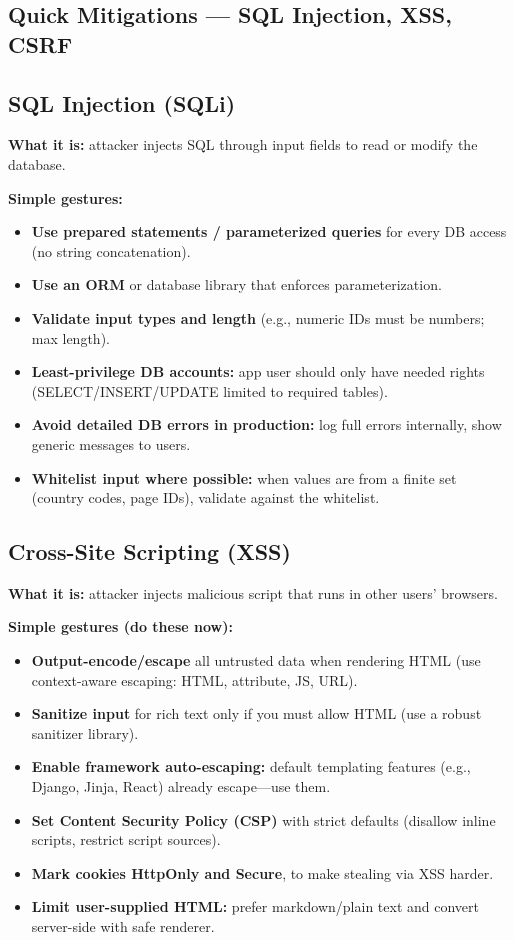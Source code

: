 \documentclass[12pt,a4paper]{report}
\begin{document}
\begin{enumerate}
\subsection*{Quick Mitigations — SQL Injection, XSS, CSRF }



\subsection*{SQL Injection (SQLi)}
\textbf{What it is:} attacker injects SQL through input fields to read or modify the database.

\textbf{Simple gestures:}
\begin{itemize}
  \item \textbf{Use prepared statements / parameterized queries} for every DB access (no string concatenation).  
  \item \textbf{Use an ORM} or database library that enforces parameterization.  
  \item \textbf{Validate input types and length} (e.g., numeric IDs must be numbers; max length).  
  \item \textbf{Least-privilege DB accounts:} app user should only have needed rights (SELECT/INSERT/UPDATE limited to required tables).  
  \item \textbf{Avoid detailed DB errors in production:} log full errors internally, show generic messages to users.  
  \item \textbf{Whitelist input where possible:} when values are from a finite set (country codes, page IDs), validate against the whitelist.  
\end{itemize}
\newpage
\subsection*{Cross-Site Scripting (XSS)}
\textbf{What it is:} attacker injects malicious script that runs in other users’ browsers.

\textbf{Simple gestures (do these now):}
\begin{itemize}
  \item \textbf{Output-encode/escape} all untrusted data when rendering HTML (use context-aware escaping: HTML, attribute, JS, URL).  
  \item \textbf{Sanitize input} for rich text only if you must allow HTML (use a robust sanitizer library).  
  \item \textbf{Enable framework auto-escaping:} default templating features (e.g., Django, Jinja, React) already escape—use them.  
  \item \textbf{Set Content Security Policy (CSP)} with strict defaults (disallow inline scripts, restrict script sources).  
  \item \textbf{Mark cookies HttpOnly and Secure}, to make stealing via XSS harder.  
  \item \textbf{Limit user-supplied HTML:} prefer markdown/plain text and convert server-side with safe renderer.  
\end{itemize}


\end{enumerate}
\end{document}
